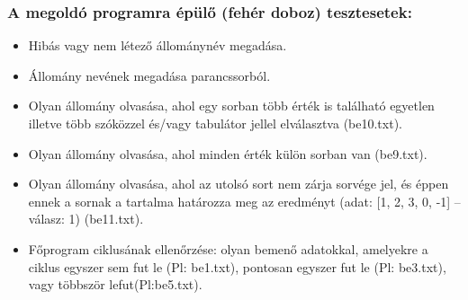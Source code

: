 \documentclass[a4paper]{article}
\begin{document}
    \subsubsection{A megoldó programra épülő (fehér doboz) tesztesetek:}
      \begin{itemize}
        \item Hibás vagy nem létező állománynév megadása.
        \item Állomány nevének megadása parancssorból.
        \item Olyan állomány olvasása, ahol egy sorban több érték is található egyetlen illetve több szóközzel és/vagy tabulátor jellel elválasztva (be10.txt).
        \item Olyan állomány olvasása, ahol minden érték külön sorban van (be9.txt).
        \item Olyan állomány olvasása, ahol az utolsó sort nem zárja sorvége jel, és éppen ennek a sornak a tartalma határozza meg az eredményt (adat: [1, 2, 3, 0, -1] – válasz: 1) (be11.txt).
        \item Főprogram ciklusának ellenőrzése: olyan bemenő adatokkal, amelyekre a ciklus egyszer sem fut le (Pl: be1.txt), pontosan egyszer fut le (Pl: be3.txt), vagy többször lefut(Pl:be5.txt).
      \end{itemize}
\end{document}
